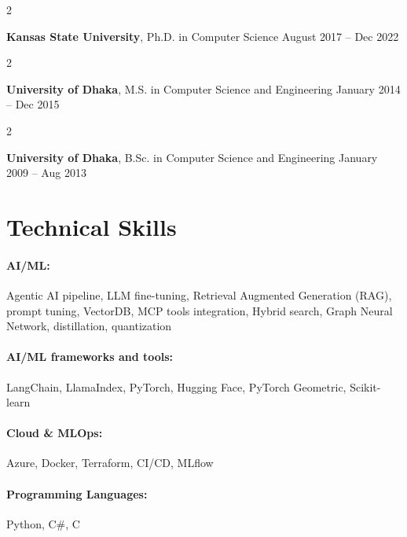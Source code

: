 \documentclass[10pt, letterpaper]{article}
\newenvironment{twocolentry}[2][]{
    \onecolentry
    \def\secondColumn{#2}
    \setcolumnwidth{\fill, 4.5 cm}
    \begin{paracol}{2}
}{
    \switchcolumn \raggedleft \secondColumn
    \end{paracol}
    \endonecolentry
} %
\begin{document}
        \begin{twocolentry}{
            August 2017 -- Dec 2022
        }
            \textbf{Kansas State University}, Ph.D. in Computer Science\end{twocolentry}

        \begin{twocolentry}{
            January 2014 -- Dec 2015
        }
            \textbf{University of Dhaka}, M.S. in Computer Science and Engineering\end{twocolentry}

        \begin{twocolentry}{
            January 2009 -- Aug 2013
        }
            \textbf{University of Dhaka}, B.Sc. in Computer Science and Engineering\end{twocolentry}

\vspace{-1mm}
\section{Technical Skills}

        \paragraph{AI/ML:} Agentic AI pipeline, LLM fine-tuning, Retrieval Augmented Generation (RAG), prompt tuning, VectorDB, MCP tools integration, Hybrid search, Graph Neural Network, distillation, quantization
        \vspace{-4mm}
        \paragraph{AI/ML frameworks and tools:} LangChain, LlamaIndex, PyTorch, Hugging Face, PyTorch Geometric, Scikit-learn
        \vspace{-4mm}
        \paragraph{Cloud \& MLOps:} Azure, Docker, Terraform, CI/CD, MLflow
        \vspace{-4mm}
        \paragraph{Programming Languages:} Python, C\#, C
\end{document}
